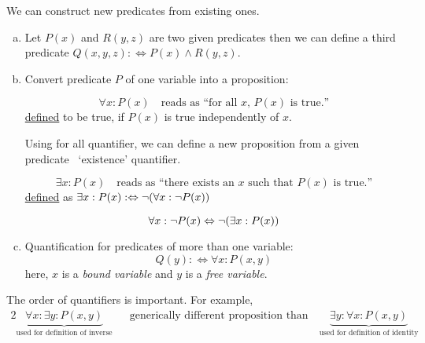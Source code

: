 We can construct new predicates from existing ones.
\begin{enumerate}[(a)]
	\item Let \(P(x)\) and \(R(y, z)\) are two given predicates then we can define a third predicate \(Q(x, y, z) :\iff P(x) \land R(y, z)\)\footnotemark.
	\item Convert predicate \(P\) of one variable into a proposition:
	      \begin{definition}
		      \begin{equation}
			      \boxed{\forall x: P(x)} \quad \text{reads as ``for all \(x\), \(P(x)\) is true.''}
		      \end{equation}
		      \uline{defined} to be true, if \(P(x)\) is true independently of \(x\).
	      \end{definition}
	      Using for all quantifier, we can define a new proposition from a given predicate \ie\ `existence' quantifier.
	      \begin{definition}
		      \begin{equation}
			      \boxed{\exists x: P(x)} \quad \text{reads as ``there exists an \(x\) such that \(P(x)\) is true.''}
		      \end{equation}
		      \uline{defined} as \(\exists x: P(x) :\Leftrightarrow \lnot\qty(\forall x: \lnot P(x))\)
	      \end{definition}

	      \begin{corollary}
		      \begin{equation}
			      \forall x: \lnot P(x) \Leftrightarrow \lnot\qty(\exists x: P(x))
		      \end{equation}
	      \end{corollary}

	\item Quantification for predicates of more than one variable:
	      \begin{equation*}
		      Q(y) :\iff \forall x: P(x, y)
	      \end{equation*}
	      here, \(x\) is a \emph{bound variable} and \(y\) is a \emph{free variable}.
\end{enumerate}
\begin{remark}
	The order of quantifiers is important. For example,
	\begin{alignat*}{2}
		\underbrace{\forall x: \exists y: P(x, y)}_{\text{used for definition of inverse}} \quad & \text{generically different proposition than} \quad \underbrace{\exists y: \forall x: P(x, y)}_{\text{used for definition of identity}}
	\end{alignat*}
\end{remark}


